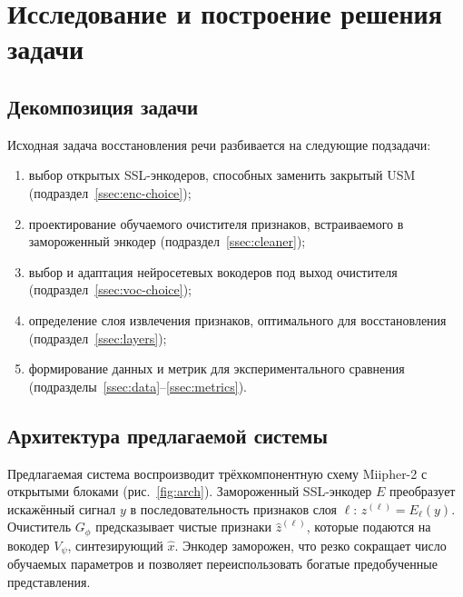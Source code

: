 \section{Исследование и построение решения задачи}
\label{sec:Chapter3} 

\subsection{Декомпозиция задачи}

Исходная задача восстановления речи разбивается на следующие подзадачи:
\begin{enumerate}
    \item выбор открытых SSL-энкодеров, способных заменить закрытый USM
        (подраздел~\ref{ssec:enc-choice});
    \item проектирование обучаемого очистителя признаков, встраиваемого в
        замороженный энкодер (подраздел~\ref{ssec:cleaner});
    \item выбор и адаптация нейросетевых вокодеров под выход очистителя
        (подраздел~\ref{ssec:voc-choice});
    \item определение слоя извлечения признаков, оптимального для восстановления
        (подраздел~\ref{ssec:layers});
    \item формирование данных и метрик для экспериментального сравнения
        (подразделы~\ref{ssec:data}--\ref{ssec:metrics}).
\end{enumerate}

\subsection{Архитектура предлагаемой системы}
\label{ssec:arch}

Предлагаемая система воспроизводит трёхкомпонентную схему Miipher-2 с открытыми
блоками (рис.~\ref{fig:arch}). Замороженный SSL-энкодер $E$ преобразует
искажённый сигнал $y$ в последовательность признаков слоя $\ell$:
$z^{(\ell)} = E_\ell(y)$. Очиститель $G_\phi$ предсказывает чистые признаки
$\hat{z}^{(\ell)}$, которые подаются на вокодер $V_\psi$, синтезирующий
$\hat{x}$. Энкодер заморожен, что резко сокращает число обучаемых параметров и
позволяет переиспользовать богатые предобученные представления.

